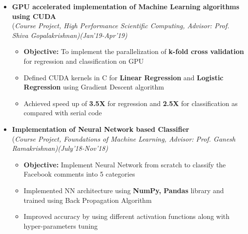 \documentclass[a4paper,10pt]{article}
\begin{document}
\begin{itemize}
\item \textbf{GPU accelerated implementation of Machine Learning algorithms using CUDA}\\
(\emph{Course Project, High Performance Scientific Computing, Advisor: Prof. Shiva Gopalakrishnan)\hfill (Jan'19-Apr’19)} \\[-0.4cm]
    \vspace{-0.05cm}
	\begin{itemize}[noitemsep,nolistsep]
	\item \textbf{Objective:} To implement the parallelization of \textbf{k-fold cross validation} for regression and classification on GPU
    \item Defined CUDA kernels in C for \textbf{Linear Regression} and \textbf{Logistic Regression} using Gradient Descent algorithm
    \item Achieved speed up of  \textbf{3.5X} for regression and \textbf{2.5X} for classification as compared with serial code
	\end{itemize}
	
\item \textbf{Implementation of Neural Network based Classifier} \\ 
(\emph{Course Project, Foundations of Machine Learning, Advisor: Prof. Ganesh Ramakrishnan)\hfill (July'18-Nov’18)} \\[-0.4cm]
    \vspace{-0.05cm}
	\begin{itemize}[noitemsep,nolistsep]
	\item \textbf{Objective:} Implement Neural Network from scratch to classify the Facebook comments into 5 categories %
    \item Implemented NN architecture using \textbf{NumPy, Pandas} library and trained using Back Propagation Algorithm
    \item Improved accuracy by using different activation functions along with hyper-parameters tuning
	\end{itemize}
	

\end{itemize}
\end{document}
